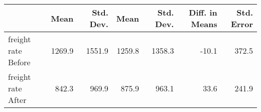 
\begin{tabular}[t]{lrrrrrr}
\toprule
  & Mean & Std. Dev. & Mean  & Std. Dev.  & Diff. in Means & Std. Error\\
\midrule
freight rate Before & 1269.9 & 1551.9 & 1259.8 & 1358.3 & -10.1 & 372.5\\
freight rate After & 842.3 & 969.9 & 875.9 & 963.1 & 33.6 & 241.9\\
\bottomrule
\end{tabular}
